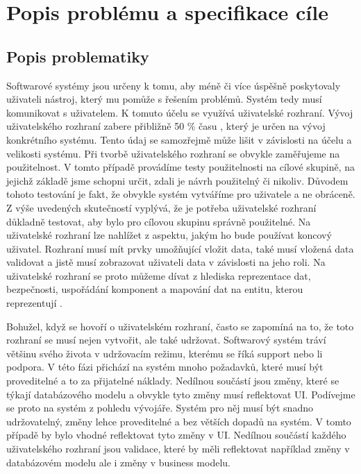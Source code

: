 \chapter{Popis problému a specifikace cíle}
\section{Popis problematiky}
Softwarové systémy jsou určeny k tomu, aby méně či více úspěšně poskytovaly uživateli nástroj, který mu pomůže s řešením problémů. Systém tedy musí komunikovat s uživatelem. K tomuto účelu se využívá uživatelské rozhraní. Vývoj uživatelského rozhraní zabere přibližně 50 \% času \cite{cernyTSUID}, který je určen na vývoj konkrétního systému. Tento údaj se samozřejmě může lišit v závislosti na účelu a velikosti systému. Při tvorbě uživatelského rozhraní se obvykle zaměřujeme na použitelnost. V tomto případě provádíme testy použitelnosti na cílové skupině, na jejichž základě jsme schopni určit, zdali je návrh použitelný či nikoliv. Důvodem tohoto testování je fakt, že obvykle systém vytváříme pro uživatele a ne obráceně. Z výše uvedených skutečností vyplývá, že je potřeba uživatelské rozhraní důkladně testovat, aby bylo pro cílovou skupinu správně použitelné. Na uživatelské rozhraní lze nahlížet z aspektu, jakým ho bude používat koncový uživatel. Rozhraní musí mít prvky umožňující vložit data, také musí vložená data validovat a jistě musí zobrazovat uživateli data v závislosti na jeho roli. Na uživatelské rozhraní se proto můžeme dívat z hlediska reprezentace dat, bezpečnosti, uspořádání komponent a mapování dat na entitu, kterou reprezentují \cite{cernyTEA}. 

Bohužel, když se hovoří o uživatelském rozhraní, často se zapomíná na to, že toto rozhraní se musí nejen vytvořit, ale také udržovat. Softwarový systém tráví většinu svého života v udržovacím režimu, kterému se říká support nebo li podpora. V této fázi přichází na systém mnoho požadavků, které musí být proveditelné a to za přijatelné náklady. Nedílnou součástí jsou změny, které se týkají databázového modelu a obvykle tyto změny musí reflektovat UI. Podívejme se proto na systém z pohledu vývojáře. Systém pro něj musí být snadno udržovatelný, změny lehce proveditelné a bez větších dopadů na systém. V tomto případě by bylo vhodné reflektovat tyto změny v UI. Nedílnou součástí každého uživatelského rozhraní jsou validace, které by měli reflektovat například změny v databázovém modelu ale i změny v business modelu.

